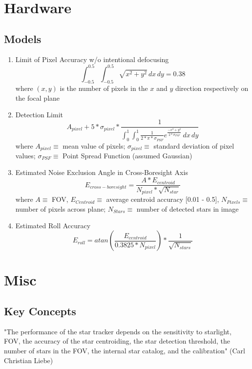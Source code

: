 \section{Hardware}
\subsection{Models}
\begin{enumerate}
    \item Limit of Pixel Accuracy w/o intentional defocusing\cite{accuracy_performance_of_star_trackers}
    \[ \int_{-0.5}^{0.5}\int_{-0.5}^{0.5} \sqrt{x^2 + y^2} \,dx\,dy  = 0.38\]
    where $(x,y)$ is the number of pixels in the $x$ and $y$ direction respectively on the focal plane

    \item Detection Limit\cite{accuracy_performance_of_star_trackers}
    \[ A_{pixel} + 5*\sigma_{pixel} * \frac{1}{\int_{0}^{1}\int_{0}^{1} \frac{1}{2*\pi*\sigma_{PSF}}e^{\frac{-x^2+y^2}{2*\sigma_{PSF}}} \,dx\,dy} \]
    where $A_{pixel}\equiv$ mean value of pixels; $\sigma_{pixel} \equiv$ standard deviation of pixel values; $\sigma_{PSF} \equiv$ Point Spread Function (assumed Gaussian)

    \item Estimated Noise Exclusion Angle in Cross-Boresight Axis
    \[ E_{cross-boresight} = \frac{A*E_{centroid}}{N_{pixel}*\sqrt{N_{star}}} \]
    where $A \equiv$ FOV, $E_{Centroid} \equiv$ average centroid accuracy [0.01 - 0.5], $N_{Pixels} \equiv$ number of pixels across plane; $N_{Stars} \equiv$ number of detected stars in image

    \item Estimated Roll Accuracy
    \[ E_{roll} = atan(\frac{E_{centroid}}{0.3825*N_{pixel}}) * \frac{1}{\sqrt{N_{stars}}} \]

\end{enumerate}

\section{Misc}
\subsection{Key Concepts}
"The performance of the star tracker depends on the sensitivity to starlight, FOV, the accuracy of the star centroiding, the star detection threshold, the number of stars in the FOV, the internal star catalog, and the calibration" (Carl Christian Liebe)\cite{accuracy_performance_of_star_trackers} \\


